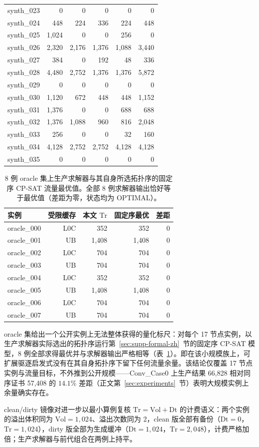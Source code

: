 \begin{longtable}{lrrrrr}
synth\_023 & 0 & 0 & 0 & 0 & 0 \\
synth\_024 & 448 & 224 & 336 & 224 & 448 \\
synth\_025 & 1,024 & 0 & 0 & 256 & 0 \\
synth\_026 & 2,320 & 2,176 & 1,376 & 1,088 & 3,440 \\
synth\_027 & 384 & 0 & 192 & 48 & 336 \\
synth\_028 & 4,480 & 2,752 & 1,376 & 1,376 & 5,872 \\
synth\_029 & 0 & 0 & 0 & 0 & 0 \\
synth\_030 & 1,120 & 672 & 448 & 448 & 1,152 \\
synth\_031 & 1,376 & 0 & 0 & 688 & 688 \\
synth\_032 & 1,376 & 1,088 & 960 & 816 & 2,048 \\
synth\_033 & 256 & 0 & 0 & 32 & 160 \\
synth\_034 & 4,128 & 2,752 & 2,752 & 4,128 & 4,128 \\
synth\_035 & 0 & 0 & 0 & 0 & 0 \\
\end{longtable}
\endgroup

\begin{table}[htbp]\centering\small
\caption{8 例 oracle 集上生产求解器与其自身所选拓扑序的固定序 CP-SAT 流量最优值。全部 8 例求解器输出恰好等于最优值（差距为零，状态均为 OPTIMAL）。}
\label{tab:supp-synth-v2-oracle-zh}
\begin{tabular}{lrrrr}\toprule
实例 & 受限缓存 & 本文 $\mathrm{Tr}$ & 固定序最优 & 差距\\\midrule
oracle\_000 & L0C & 352 & 352 & 0\\
oracle\_001 & UB & 1,408 & 1,408 & 0\\
oracle\_002 & L0C & 704 & 704 & 0\\
oracle\_003 & UB & 704 & 704 & 0\\
oracle\_004 & L0C & 352 & 352 & 0\\
oracle\_005 & UB & 1,408 & 1,408 & 0\\
oracle\_006 & L0C & 704 & 704 & 0\\
oracle\_007 & UB & 704 & 704 & 0\\\bottomrule
\end{tabular}\end{table}

oracle 集给出一个公开实例上无法整体获得的量化标尺：对每个 17 节点实例，以生产求解器实际选出的拓扑序运行第~\ref{sec:supp-formal-zh}~节的固定序 CP-SAT 模型，8 例全部求得最优并与求解器输出严格相等（表~\ref{tab:supp-synth-v2-oracle-zh}）。即在该小规模族上，可扩展驱逐启发式没有在其自身拓扑序下留下任何流量余量。该结论仅覆盖 17 节点实例与流量目标，不外推到公开规模——Conv\_Case0 上生产结果 66,828 相对同序证书 57,408 的 $14.1\%$ 差距（正文第~\ref{sec:experiments}~节）表明大规模实例上余量确实存在。

clean/dirty 镜像对进一步以最小算例复核 $\mathrm{Tr}=\mathrm{Vol}+\mathrm{Dt}$ 的计费语义：两个实例的溢出体积同为 $\mathrm{Vol}=1{,}024$、溢出次数同为 2，clean 版全部有备份（$\mathrm{Dt}=0$，$\mathrm{Tr}=1{,}024$），dirty 版全部为生成缓冲（$\mathrm{Dt}=1{,}024$，$\mathrm{Tr}=2{,}048$），计费严格加倍；生产求解器与前代组合在两例上持平。
